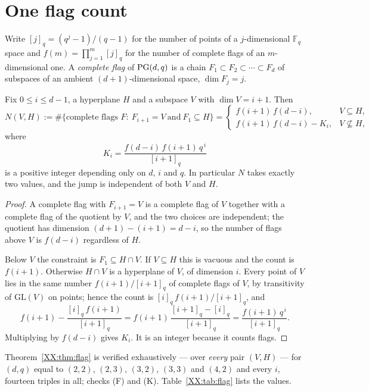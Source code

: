 \section{One flag count}

Write $[j]_q=(q^{j}-1)/(q-1)$ for the number of points of a $j$-dimensional $\mathbb{F}_q$
space and $f(m)=\prod_{j=1}^{m}[j]_q$ for the number of complete flags of an $m$-dimensional
one. A \emph{complete flag} of $\mathrm{PG}(d,q)$ is a chain $F_1\subset F_2\subset\cdots\subset F_d$
of subspaces of an ambient $(d{+}1)$-dimensional space, $\dim F_j=j$.

\begin{theorem}\label{XX:thm:flag}
Fix $0\le i\le d-1$, a hyperplane $H$ and a subspace $V$ with $\dim V=i+1$. Then
\[
  N(V,H):=\#\{\text{complete flags } F:\ F_{i+1}=V\ \text{and}\ F_1\subseteq H\}
  =\begin{cases}
     f(i+1)\,f(d-i), & V\subseteq H,\\[2pt]
     f(i+1)\,f(d-i)-K_i, & V\not\subseteq H,
   \end{cases}
\]
where
\[
  K_i=\frac{f(d-i)\,f(i+1)\,q^{\,i}}{[i+1]_q}
\]
is a positive integer depending only on $d$, $i$ and $q$. In particular $N$ takes exactly
two values, and the jump is independent of both $V$ and $H$.
\end{theorem}

\begin{proof}
A complete flag with $F_{i+1}=V$ is a complete flag of $V$ together with a complete flag of
the quotient by $V$, and the two choices are independent; the quotient has dimension
$(d+1)-(i+1)=d-i$, so the number of flags above $V$ is $f(d-i)$ regardless of $H$.

Below $V$ the constraint is $F_1\subseteq H\cap V$. If $V\subseteq H$ this is vacuous and the
count is $f(i+1)$. Otherwise $H\cap V$ is a hyperplane of $V$, of dimension $i$. Every point
of $V$ lies in the same number $f(i+1)/[i+1]_q$ of complete flags of $V$, by transitivity of
$\mathrm{GL}(V)$ on points; hence the count is $[i]_q\,f(i+1)/[i+1]_q$, and
\[
  f(i+1)-\frac{[i]_q\,f(i+1)}{[i+1]_q}
  =f(i+1)\,\frac{[i+1]_q-[i]_q}{[i+1]_q}
  =\frac{f(i+1)\,q^{\,i}}{[i+1]_q} .
\]
Multiplying by $f(d-i)$ gives $K_i$. It is an integer because it counts flags.
\end{proof}

Theorem~\ref{XX:thm:flag} is verified exhaustively --- over \emph{every} pair $(V,H)$ --- for
$(d,q)$ equal to $(2,2)$, $(2,3)$, $(3,2)$, $(3,3)$ and $(4,2)$ and every $i$, fourteen
triples in all; checks
(F) and (K). Table~\ref{XX:tab:flag} lists the values.

